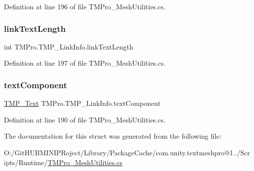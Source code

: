 Definition at line 196 of file T\+M\+Pro\+\_\+\+Mesh\+Utilities.\+cs.

\mbox{\label{struct_t_m_pro_1_1_t_m_p___link_info_a849c7b081aef9237b7e6f713ba53aff7}} 
\subsubsection{\texorpdfstring{linkTextLength}{linkTextLength}}
{\footnotesize\ttfamily int T\+M\+Pro.\+T\+M\+P\+\_\+\+Link\+Info.\+link\+Text\+Length}



Definition at line 197 of file T\+M\+Pro\+\_\+\+Mesh\+Utilities.\+cs.

\mbox{\label{struct_t_m_pro_1_1_t_m_p___link_info_ab50877c1874c0051b0846003062139e5}} 
\subsubsection{\texorpdfstring{textComponent}{textComponent}}
{\footnotesize\ttfamily \mbox{\hyperlink{class_t_m_pro_1_1_t_m_p___text}{T\+M\+P\+\_\+\+Text}} T\+M\+Pro.\+T\+M\+P\+\_\+\+Link\+Info.\+text\+Component}



Definition at line 190 of file T\+M\+Pro\+\_\+\+Mesh\+Utilities.\+cs.



The documentation for this struct was generated from the following file\+:\begin{DoxyCompactItemize}
\item 
O\+:/\+Git\+H\+U\+B\+M\+I\+N\+I\+P\+Roject/\+Library/\+Package\+Cache/com.\+unity.\+textmeshpro@1../\+Scripts/\+Runtime/\mbox{\hyperlink{_t_m_pro___mesh_utilities_8cs}{T\+M\+Pro\+\_\+\+Mesh\+Utilities.\+cs}}\end{DoxyCompactItemize}
